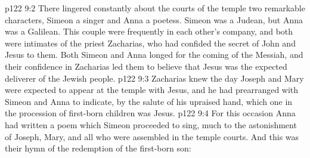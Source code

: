 \pc \vs p122 9:2 There lingered constantly about the courts of the temple two remarkable characters, Simeon a singer and Anna a poetess. Simeon was a Judean, but Anna was a Galilean. This couple were frequently in each other’s company, and both were intimates of the priest Zacharias, who had confided the secret of John and Jesus to them. Both Simeon and Anna longed for the coming of the Messiah, and their confidence in Zacharias led them to believe that Jesus was the expected deliverer of the Jewish people.
\vs p122 9:3 Zacharias knew the day Joseph and Mary were expected to appear at the temple with Jesus, and he had prearranged with Simeon and Anna to indicate, by the salute of his upraised hand, which one in the procession of first\hyp{}born children was Jesus.
\vs p122 9:4 For this occasion Anna had written a poem which Simeon proceeded to sing, much to the astonishment of Joseph, Mary, and all who were assembled in the temple courts. And this was their hymn of the redemption of the first\hyp{}born son:
